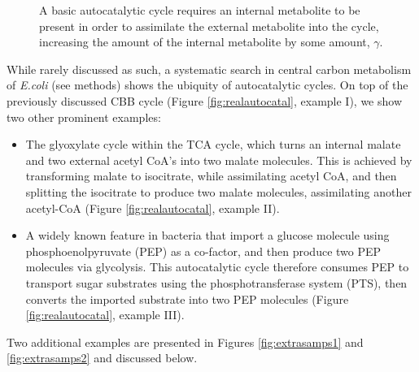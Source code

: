 \begin{figure}[h!]
    \centering{
        }
\caption{
    \label{fig:autocataldef}
  A basic autocatalytic cycle requires an internal metabolite to be present in order to assimilate the external metabolite into the cycle, increasing the amount of the internal metabolite by some amount, $\gamma$.}
\end{figure}
 
While rarely discussed as such, a systematic search in central carbon metabolism of \emph{E.coli} (see methods) shows the ubiquity of autocatalytic cycles.
On top of the previously discussed CBB cycle (Figure \ref{fig:realautocatal}, example I), we show two other prominent examples:
\begin{itemize}
    \item The glyoxylate cycle within the TCA cycle, which turns an internal malate and two external acetyl CoA's into two malate molecules.
        This is achieved by transforming malate to isocitrate, while assimilating acetyl CoA, and then splitting the isocitrate to produce two malate molecules, assimilating another acetyl-CoA \cite{Kornberg1966-lh} (Figure \ref{fig:realautocatal}, example II).
    \item A widely known feature in bacteria that import a glucose molecule using phosphoenolpyruvate (PEP) as a co-factor, and then produce two PEP molecules via glycolysis.
        This autocatalytic cycle therefore consumes PEP to transport sugar substrates using the phosphotransferase system (PTS), then converts the imported substrate into two PEP molecules (Figure \ref{fig:realautocatal}, example III).

\end{itemize}
Two additional examples are presented in Figures \ref{fig:extrasamps1} and \ref{fig:extrasamps2} and discussed below.

